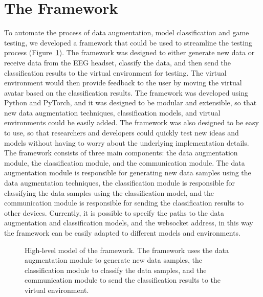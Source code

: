 \section{The Framework}
To automate the process of data augmentation, model classification and game testing, we developed a framework that could be used to streamline the testing process (Figure~\ref{fig:framework}).
The framework was designed to either generate new data or receive data from the EEG headset, classify the data, and then send the classification results to the virtual environment for testing.
The virtual environment would then provide feedback to the user by moving the virtual avatar based on the classification results.
The framework was developed using Python and PyTorch, and it was designed to be modular and extensible, so that new data augmentation techniques, classification models, and virtual environments could be easily added.
The framework was also designed to be easy to use, so that researchers and developers could quickly test new ideas and models without having to worry about the underlying implementation details.
The framework consists of three main components: the data augmentation module, the classification module, and the communication module.
The data augmentation module is responsible for generating new data samples using the data augmentation techniques, the classification module is responsible for classifying the data samples using the classification model, and the communication module is responsible for sending the classification results to other devices.
Currently, it is possible to specify the paths to the data augmentation and classification models, and the websocket address, in this way the framework can be easily adapted to different models and environments.

\begin{figure}[!htbp]
    \centering
\caption{High-level model of the framework.
The framework uses the data augmentation module to generate new data samples, the classification module to classify the data samples, and the communication module to send the classification results to the virtual environment.}
\label{fig:framework}
\end{figure}

